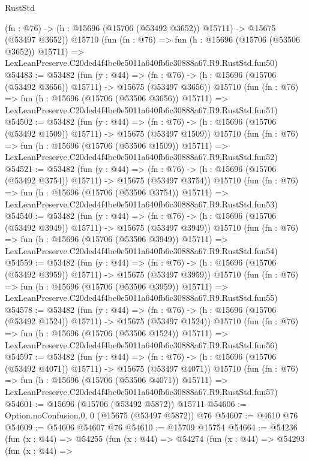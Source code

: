 \begin{lexlean}{RustStd}
\begin{coremodule}
    (fn : @76) -> (h : @15696 (@15706 (@53492 @3652)) @15711) -> @15675 (@53497 @3652))
    @15710
    (fun (fn : @76) =>
    fun (h : @15696 (@15706 (@53506 @3652)) @15711) =>
    LexLeanPreserve.C20ded4f4be0e5011a640fb6c30888a67.R9.RustStd.fun50)
@54483 := @53482
    (fun (y : @44) =>
    (fn : @76) -> (h : @15696 (@15706 (@53492 @3656)) @15711) -> @15675 (@53497 @3656))
    @15710
    (fun (fn : @76) =>
    fun (h : @15696 (@15706 (@53506 @3656)) @15711) =>
    LexLeanPreserve.C20ded4f4be0e5011a640fb6c30888a67.R9.RustStd.fun51)
@54502 := @53482
    (fun (y : @44) =>
    (fn : @76) -> (h : @15696 (@15706 (@53492 @1509)) @15711) -> @15675 (@53497 @1509))
    @15710
    (fun (fn : @76) =>
    fun (h : @15696 (@15706 (@53506 @1509)) @15711) =>
    LexLeanPreserve.C20ded4f4be0e5011a640fb6c30888a67.R9.RustStd.fun52)
@54521 := @53482
    (fun (y : @44) =>
    (fn : @76) -> (h : @15696 (@15706 (@53492 @3754)) @15711) -> @15675 (@53497 @3754))
    @15710
    (fun (fn : @76) =>
    fun (h : @15696 (@15706 (@53506 @3754)) @15711) =>
    LexLeanPreserve.C20ded4f4be0e5011a640fb6c30888a67.R9.RustStd.fun53)
@54540 := @53482
    (fun (y : @44) =>
    (fn : @76) -> (h : @15696 (@15706 (@53492 @3949)) @15711) -> @15675 (@53497 @3949))
    @15710
    (fun (fn : @76) =>
    fun (h : @15696 (@15706 (@53506 @3949)) @15711) =>
    LexLeanPreserve.C20ded4f4be0e5011a640fb6c30888a67.R9.RustStd.fun54)
@54559 := @53482
    (fun (y : @44) =>
    (fn : @76) -> (h : @15696 (@15706 (@53492 @3959)) @15711) -> @15675 (@53497 @3959))
    @15710
    (fun (fn : @76) =>
    fun (h : @15696 (@15706 (@53506 @3959)) @15711) =>
    LexLeanPreserve.C20ded4f4be0e5011a640fb6c30888a67.R9.RustStd.fun55)
@54578 := @53482
    (fun (y : @44) =>
    (fn : @76) -> (h : @15696 (@15706 (@53492 @1524)) @15711) -> @15675 (@53497 @1524))
    @15710
    (fun (fn : @76) =>
    fun (h : @15696 (@15706 (@53506 @1524)) @15711) =>
    LexLeanPreserve.C20ded4f4be0e5011a640fb6c30888a67.R9.RustStd.fun56)
@54597 := @53482
    (fun (y : @44) =>
    (fn : @76) -> (h : @15696 (@15706 (@53492 @4071)) @15711) -> @15675 (@53497 @4071))
    @15710
    (fun (fn : @76) =>
    fun (h : @15696 (@15706 (@53506 @4071)) @15711) =>
    LexLeanPreserve.C20ded4f4be0e5011a640fb6c30888a67.R9.RustStd.fun57)
@54601 := @15696 (@15706 (@53492 @5872)) @15711
@54606 := Option.noConfusion.{0, 0} (@15675 (@53497 @5872)) @76
@54607 := @4610 @76
@54609 := @54606 @54607 @76
@54610 := @15709 @15754
@54664 := @54236
    (fun (x : @44) =>
    @54255
      (fun (x : @44) =>
      @54274
        (fun (x : @44) =>
        @54293
          (fun (x : @44) =>

\end{coremodule}
\end{lexlean}
